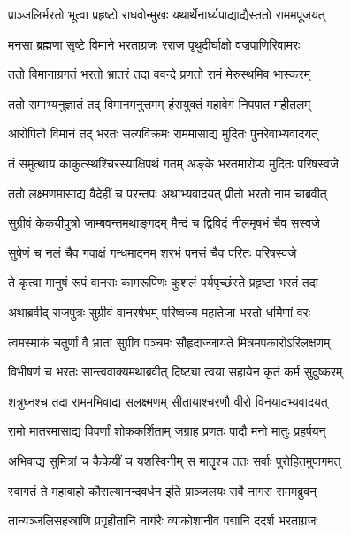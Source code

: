 \twolineshloka
{प्राञ्जलिर्भरतो भूत्वा प्रहृष्टो राघवोन्मुखः}
{यथार्थेनार्घ्यपाद्याद्यैस्ततो राममपूजयत्} %

\twolineshloka
{मनसा ब्रह्मणा सृष्टे विमाने भरताग्रजः}
{रराज पृथुदीर्घाक्षो वज्रपाणिरिवामरः} %

\twolineshloka
{ततो विमानाग्रगतं भरतो भ्रातरं तदा}
{ववन्दे प्रणतो रामं मेरुस्थमिव भास्करम्} %

\twolineshloka
{ततो रामाभ्यनुज्ञातं तद् विमानमनुत्तमम्}
{हंसयुक्तं महावेगं निपपात महीतलम्} %

\twolineshloka
{आरोपितो विमानं तद् भरतः सत्यविक्रमः}
{राममासाद्य मुदितः पुनरेवाभ्यवादयत्} %

\twolineshloka
{तं समुत्थाय काकुत्स्थश्चिरस्याक्षिपथं गतम्}
{अङ्के भरतमारोप्य मुदितः परिषस्वजे} %

\twolineshloka
{ततो लक्ष्मणमासाद्य वैदेहीं च परन्तपः}
{अथाभ्यवादयत् प्रीतो भरतो नाम चाब्रवीत्} %

\twolineshloka
{सुग्रीवं केकयीपुत्रो जाम्बवन्तमथाङ्गदम्}
{मैन्दं च द्विविदं नीलमृषभं चैव सस्वजे} %

\twolineshloka
{सुषेणं च नलं चैव गवाक्षं गन्धमादनम्}
{शरभं पनसं चैव परितः परिषस्वजे} %

\twolineshloka
{ते कृत्वा मानुषं रूपं वानराः कामरूपिणः}
{कुशलं पर्यपृच्छंस्ते प्रहृष्टा भरतं तदा} %

\twolineshloka
{अथाब्रवीद् राजपुत्रः सुग्रीवं वानरर्षभम्}
{परिष्वज्य महातेजा भरतो धर्मिणां वरः} %

\twolineshloka
{त्वमस्माकं चतुर्णां वै भ्राता सुग्रीव पञ्चमः}
{सौहृदाज्जायते मित्रमपकारोऽरिलक्षणम्} %

\twolineshloka
{विभीषणं च भरतः सान्त्ववाक्यमथाब्रवीत्}
{दिष्ट्या त्वया सहायेन कृतं कर्म सुदुष्करम्} %

\twolineshloka
{शत्रुघ्नश्च तदा राममभिवाद्य सलक्ष्मणम्}
{सीतायाश्चरणौ वीरो विनयादभ्यवादयत्} %

\twolineshloka
{रामो मातरमासाद्य विवर्णां शोककर्शिताम्}
{जग्राह प्रणतः पादौ मनो मातुः प्रहर्षयन्} %

\twolineshloka
{अभिवाद्य सुमित्रां च कैकेयीं च यशस्विनीम्}
{स मातॄश्च ततः सर्वाः पुरोहितमुपागमत्} %

\twolineshloka
{स्वागतं ते महाबाहो कौसल्यानन्दवर्धन}
{इति प्राञ्जलयः सर्वे नागरा राममब्रुवन्} %

\twolineshloka
{तान्यञ्जलिसहस्राणि प्रगृहीतानि नागरैः}
{व्याकोशानीव पद्मानि ददर्श भरताग्रजः} %

